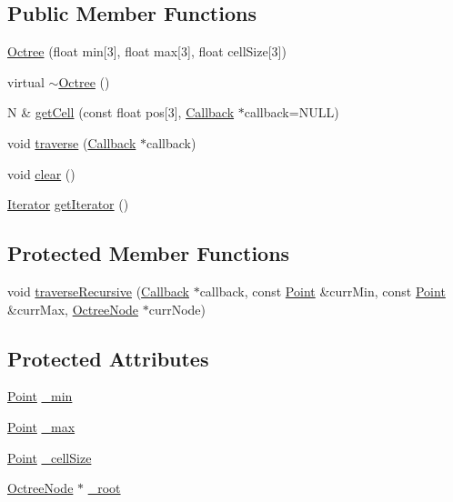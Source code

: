 \subsection*{Public Member Functions}
\begin{DoxyCompactItemize}
\item 
\hyperlink{classOctree_aad1a0fd489e7412610b0161cff5da573}{Octree} (float min\mbox{[}3\mbox{]}, float max\mbox{[}3\mbox{]}, float cell\+Size\mbox{[}3\mbox{]})
\item 
virtual \hyperlink{classOctree_a7fb8884a9c9147da4020217f58237932}{$\sim$\+Octree} ()
\item 
N \& \hyperlink{classOctree_aeb0eeedf29f8c026ba53689def0c2f6b}{get\+Cell} (const float pos\mbox{[}3\mbox{]}, \hyperlink{classOctree_1_1Callback}{Callback} $\ast$callback=N\+U\+LL)
\item 
void \hyperlink{classOctree_a13d22bffc1be63deb3557c230ac5e17e}{traverse} (\hyperlink{classOctree_1_1Callback}{Callback} $\ast$callback)
\item 
void \hyperlink{classOctree_a4038c20a015dbf6b74fd9ccd76fb80cd}{clear} ()
\item 
\hyperlink{classOctree_1_1Iterator}{Iterator} \hyperlink{classOctree_ad2974d58fadff0b043d6e8b1828b509c}{get\+Iterator} ()
\end{DoxyCompactItemize}
\subsection*{Protected Member Functions}
\begin{DoxyCompactItemize}
\item 
void \hyperlink{classOctree_a2f7949797701cd01d398a76c323ec845}{traverse\+Recursive} (\hyperlink{classOctree_1_1Callback}{Callback} $\ast$callback, const \hyperlink{structOctree_1_1Point}{Point} \&curr\+Min, const \hyperlink{structOctree_1_1Point}{Point} \&curr\+Max, \hyperlink{structOctree_1_1OctreeNode}{Octree\+Node} $\ast$curr\+Node)
\end{DoxyCompactItemize}
\subsection*{Protected Attributes}
\begin{DoxyCompactItemize}
\item 
\hyperlink{structOctree_1_1Point}{Point} \hyperlink{classOctree_ab47cc9e63705799270956fc6f769c277}{\+\_\+min}
\item 
\hyperlink{structOctree_1_1Point}{Point} \hyperlink{classOctree_a58bcb3926893c3c8d463e05859fd600c}{\+\_\+max}
\item 
\hyperlink{structOctree_1_1Point}{Point} \hyperlink{classOctree_a6b398a3bf87d71dabc6b72180a551f0b}{\+\_\+cell\+Size}
\item 
\hyperlink{structOctree_1_1OctreeNode}{Octree\+Node} $\ast$ \hyperlink{classOctree_a1825458b3af1769fc9ce7021b8438574}{\+\_\+root}
\end{DoxyCompactItemize}


